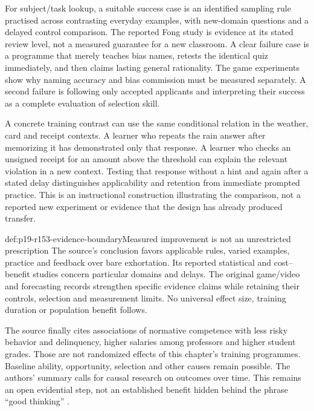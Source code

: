 For subject/task lookup, a suitable success case is an identified sampling
rule practised across contrasting everyday examples, with new-domain
questions and a delayed control comparison. The reported Fong study is
evidence at its stated review level, not a measured guarantee for a new
classroom. A clear failure case is a programme that merely teaches bias
names, retests the identical quiz immediately, and then claims lasting
general rationality. The game experiments show why naming accuracy and
bias commission must be measured separately. A second failure is
following only accepted applicants and interpreting their success as a
complete evaluation of selection skill.

A concrete training contrast can use the same conditional relation in
the weather, card and receipt contexts. A learner who repeats the rain
answer after memorizing it has demonstrated only that response. A learner
who checks an unsigned receipt for an amount above the threshold can
explain the relevant violation in a new context. Testing that response
without a hint and again after a stated delay distinguishes applicability
and retention from immediate prompted practice. This is an instructional
construction illustrating the comparison, not a reported new experiment
or evidence that the design has already produced transfer.

\begin{proofboundary}{def:p19-r153-evidence-boundary}{Measured improvement is not an unrestricted prescription}
The source's conclusion favors applicable rules, varied examples,
practice and feedback over bare exhortation. Its reported statistical
and cost--benefit studies concern particular domains and delays. The
original game/video and forecasting records strengthen specific evidence
claims while retaining their controls, selection and measurement limits.
No universal effect size, training duration or population benefit follows.

The source finally cites associations of normative competence with less
risky behavior and delinquency, higher salaries among professors and
higher student grades. Those are not randomized effects of this chapter's
training programmes. Baseline ability, opportunity, selection and other
causes remain possible. The authors' summary calls for causal research
on outcomes over time. This remains an open evidential step, not an
established benefit hidden behind the phrase ``good thinking''
\cite[pp.~801, 805]{DeOliveiraNisbett2021Improve}.
\end{proofboundary}
